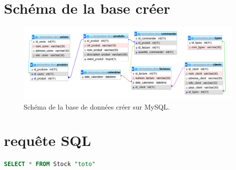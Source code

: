 \documentclass[french]{article}
\begin{document}
\newpage
\section{Schéma de la base créer}

\begin{figure}[!htbp]
    \centering
    \includegraphics[width=\textwidth]{Rapport/Image/schema_bdd.PNG}
    \caption{Schéma de la base de données créer sur MySQL.}
    \label{fig:schema_bdd}
\end{figure}


\section{requête SQL}

\begin{lstlisting}[language=sql]
SELECT * FROM Stock "toto"
\end{lstlisting}
\end{document}
